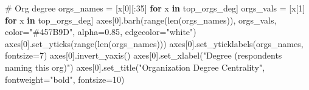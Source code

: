 \documentclass[
  letterpaper,
  DIV=11,
  numbers=noendperiod]{scrartcl}
\newenvironment{Shaded}{\begin{snugshade}}{\end{snugshade}}
\newcommand{\BuiltInTok}[1]{\textcolor[rgb]{0.00,0.23,0.31}{#1}}
\newcommand{\CommentTok}[1]{\textcolor[rgb]{0.37,0.37,0.37}{#1}}
\newcommand{\ControlFlowTok}[1]{\textcolor[rgb]{0.00,0.23,0.31}{\textbf{#1}}}
\newcommand{\DecValTok}[1]{\textcolor[rgb]{0.68,0.00,0.00}{#1}}
\newcommand{\FloatTok}[1]{\textcolor[rgb]{0.68,0.00,0.00}{#1}}
\newcommand{\KeywordTok}[1]{\textcolor[rgb]{0.00,0.23,0.31}{\textbf{#1}}}
\newcommand{\NormalTok}[1]{\textcolor[rgb]{0.00,0.23,0.31}{#1}}
\newcommand{\OperatorTok}[1]{\textcolor[rgb]{0.37,0.37,0.37}{#1}}
\newcommand{\StringTok}[1]{\textcolor[rgb]{0.13,0.47,0.30}{#1}}
\begin{document}
\begin{Shaded}
\begin{Highlighting}[]
\CommentTok{\# Org degree}
\NormalTok{orgs\_names }\OperatorTok{=}\NormalTok{ [x[}\DecValTok{0}\NormalTok{][:}\DecValTok{35}\NormalTok{] }\ControlFlowTok{for}\NormalTok{ x }\KeywordTok{in}\NormalTok{ top\_orgs\_deg]}
\NormalTok{orgs\_vals }\OperatorTok{=}\NormalTok{ [x[}\DecValTok{1}\NormalTok{] }\ControlFlowTok{for}\NormalTok{ x }\KeywordTok{in}\NormalTok{ top\_orgs\_deg]}
\NormalTok{axes[}\DecValTok{0}\NormalTok{].barh(}\BuiltInTok{range}\NormalTok{(}\BuiltInTok{len}\NormalTok{(orgs\_names)), orgs\_vals, color}\OperatorTok{=}\StringTok{"\#457B9D"}\NormalTok{,}
\NormalTok{             alpha}\OperatorTok{=}\FloatTok{0.85}\NormalTok{, edgecolor}\OperatorTok{=}\StringTok{"white"}\NormalTok{)}
\NormalTok{axes[}\DecValTok{0}\NormalTok{].set\_yticks(}\BuiltInTok{range}\NormalTok{(}\BuiltInTok{len}\NormalTok{(orgs\_names)))}
\NormalTok{axes[}\DecValTok{0}\NormalTok{].set\_yticklabels(orgs\_names, fontsize}\OperatorTok{=}\DecValTok{7}\NormalTok{)}
\NormalTok{axes[}\DecValTok{0}\NormalTok{].invert\_yaxis()}
\NormalTok{axes[}\DecValTok{0}\NormalTok{].set\_xlabel(}\StringTok{"Degree (respondents naming this org)"}\NormalTok{)}
\NormalTok{axes[}\DecValTok{0}\NormalTok{].set\_title(}\StringTok{"Organization Degree Centrality"}\NormalTok{,}
\NormalTok{                  fontweight}\OperatorTok{=}\StringTok{"bold"}\NormalTok{, fontsize}\OperatorTok{=}\DecValTok{10}\NormalTok{)}


\end{Highlighting}
\end{Shaded}
\end{document}
